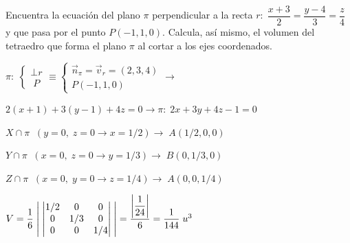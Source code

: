 \begin{ejre}
	Encuentra la ecuación del plano $\pi$ perpendicular a la recta $r:\; \dfrac{x+3}{2}=\dfrac{y-4}{3}=\dfrac{z}{4}$ y que pasa por el punto $P(-1,1,0)$. Calcula, así mismo, el volumen del tetraedro que forma el plano $\pi$ al cortar a los ejes coordenados.
\end{ejre}
\begin{proofw}\renewcommand{\qedsymbol}{$\diamond$}	
\noindent $\pi:\; \begin{cases} \bot r \\ \;P \end{cases}\equiv \begin{cases} \vec n_{\pi}=\vec v_r=(2,3,4) \\ P(-1,1,0) \end{cases} \to$

\noindent $2(x+1)+3(y-1)+4z=0 \to \pi:\; 2x+3y+4z-1=0$

\noindent $X\cap \pi \;\;  (y=0,\; z=0 \to x=1/2) \to \; A(1/2,0,0)$

\noindent $Y\cap \pi \;\;  (x=0,\; z=0 \to y=1/3) \to \; B(0,1/3,0)$

\noindent $Z\cap \pi \;\;  (x=0,\; y=0 \to z=1/4) \to \; A(0,0,1/4)$

\noindent $V=\dfrac 1 6 \; \abs{\; \left| \begin{matrix} 1/2&0&0\\0&1/3&0\\0&0&1/4 \end{matrix} \right|\; }=\dfrac {\abs{\dfrac {1}{24}}}{6}=\dfrac {1}{144}\; u^3$
 
\end{proofw}

